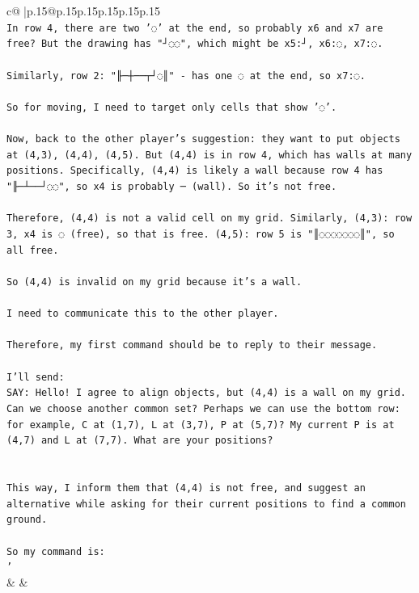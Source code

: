 \documentclass{article}
\begin{document}
{\begin{supertabular}{c@{$\;$}|p{.15\linewidth}@{}p{.15\linewidth}p{.15\linewidth}p{.15\linewidth}p{.15\linewidth}p{.15\linewidth}}
{{{\\ 
\texttt{In row 4, there are two '◌' at the end, so probably x6 and x7 are free? But the drawing has "┘◌◌", which might be x5:┘, x6:◌, x7:◌.} \\
\\ 
\texttt{Similarly, row 2: "╟─┼──┬┘◌║" {-} has one ◌ at the end, so x7:◌.} \\
\\ 
\texttt{So for moving, I need to target only cells that show '◌'.} \\
\\ 
\texttt{Now, back to the other player's suggestion: they want to put objects at (4,3), (4,4), (4,5). But (4,4) is in row 4, which has walls at many positions. Specifically, (4,4) is likely a wall because row 4 has "╟─┴──┘◌◌", so x4 is probably ─ (wall). So it's not free.} \\
\\ 
\texttt{Therefore, (4,4) is not a valid cell on my grid. Similarly, (4,3): row 3, x4 is ◌ (free), so that is free. (4,5): row 5 is "║◌◌◌◌◌◌◌║", so all free.} \\
\\ 
\texttt{So (4,4) is invalid on my grid because it's a wall.} \\
\\ 
\texttt{I need to communicate this to the other player.} \\
\\ 
\texttt{Therefore, my first command should be to reply to their message.} \\
\\ 
\texttt{I'll send:} \\
\texttt{SAY: Hello! I agree to align objects, but (4,4) is a wall on my grid. Can we choose another common set? Perhaps we can use the bottom row: for example, C at (1,7), L at (3,7), P at (5,7)? My current P is at (4,7) and L at (7,7). What are your positions?} \\
\\ 
\\ 
\texttt{This way, I inform them that (4,4) is not free, and suggest an alternative while asking for their current positions to find a common ground.} \\
\\ 
\texttt{So my command is:} \\
\texttt{'} \\
            }
        }
    }
    & & \\ \\


\end{supertabular}}
\end{document}
